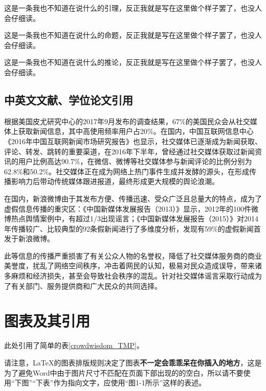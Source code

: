 \documentclass[a4paper,AutoFakeBold,oneside,12pt]{book}
\begin{document}
\begin{lemma}
这是一条我也不知道在说什么的引理，反正我就是写在这里做个样子罢了，也没人会仔细读。
\end{lemma}

\begin{proposition}
这是一条我也不知道在说什么的命题，反正我就是写在这里做个样子罢了，也没人会仔细读。
\end{proposition}

\begin{corollary}
这是一条我也不知道在说什么的推论，反正我就是写在这里做个样子罢了，也没人会仔细读。
\end{corollary}

\subsection{中英文文献、学位论文引用}
根据美国皮尤研究中心的2017年9月发布的调查结果\cite{pew_news_use_2017}，67\%的美国民众会从社交媒体上获取新闻信息，其中高使用频率用户占20\%。在国内，中国互联网信息中心《2016年中国互联网新闻市场研究报告》\cite{internet_news_2016}也显示，社交媒体已逐渐成为新闻获取、评论、转发、跳转的重要渠道，在2016年下半年，曾经通过社交媒体获取过新闻资讯的用户比例高达90.7\%，在微信、微博等社交媒体参与新闻评论的比例分别为62.8\%和50.2\%。社交媒体正在成为网络上热门事件生成并发酵的源头，在形成传播影响力后带动传统媒体跟进报道，最终形成更大规模的舆论浪潮。\cite{Yang2012Automatic}

在国内，新浪微博由于其发布方便、传播迅速、受众广泛且总量大的特点，成为了虚假信息传播的重灾区：《中国新媒体发展报告（2013）》\cite{唐绪军2013中国新媒体发展报告}显示，2012年的100件微博热点舆情案例中，有超过1/3出现谣言；《中国新媒体发展报告（2015）》\cite{唐绪军2015中国新媒体发展报告}对2014年传播较广、比较典型的92条假新闻进行了多维度分析，发现有59\%的虚假新闻首发于新浪微博。

此等信息的传播严重损害了有关公众人物的名誉权，降低了社交媒体服务商的商业美誉度，扰乱了网络空间秩序，冲击着网民的认知，极易对民众造成误导，带来诸多麻烦和经济损失，甚至会导致社会秩序的混乱。针对社交媒体谣言采取行动成为了有关部门、服务提供商和广大民众的共同选择。\cite{周兴2017基于深度学习的谣言检测及模式挖掘}

\section{图表及其引用}
此处引用了简单的表\ref{crowdwisdom_TMP}。

请注意，\LaTeX{}的图表排版规则决定了图表\textbf{不一定会乖乖呆在你插入的地方}，这是为了避免Word中由于图片尺寸不匹配在页面下部出现的的空白，所以请不要使用“下图”“下表”作为指向文字，应使用“图1-1所示”这样的表述。
\end{document}
